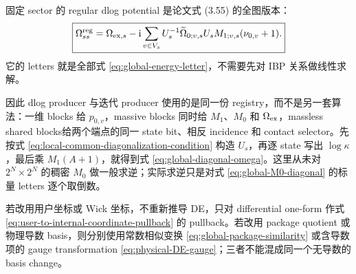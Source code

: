 \documentclass[11pt,a4paper]{ctexart}
\newcommand{\ii}{\mathrm i}
\begin{document}
固定 sector 的 regular dlog potential 是论文式 (3.55) 的全图版本：
\begin{equation}
 \boxed{
 \Omega_{ss}^{\rm reg}
 =\Omega_{{\rm ex},s}
 -\ii\sum_{v\in V_s}
 U_s^{-1}\widetilde\Omega_{0;v,s}U_s
 M_{1;v,s}(\nu_{0,v}+1).
 }
 \label{eq:global-diagonal-omega}
\end{equation}
它的 letters 就是全部式 \eqref{eq:global-energy-letter}，不需要先对 IBP 关系做线性求解。

因此 dlog producer 与迭代 producer 使用的是同一份 registry，而不是另一套算法：一维 blocks 给 $p_{0,v}$，massive blocks 同时给 $M_1$、$M_0$ 和 $\Omega_{\rm ex}$，massless shared blocks给两个端点的同一 state bit、相反 incidence 和 contact selector。先按式 \eqref{eq:local-common-diagonalization-condition} 构造 $U_s$，再逐 state 写出 $\log\kappa$，最后乘 $M_1(A+1)$，就得到式 \eqref{eq:global-diagonal-omega}。这里从未对 $2^N\times2^N$ 的稠密 $M_0$ 做一般求逆；实际求逆只是对式 \eqref{eq:global-M0-diagonal} 的标量 letters 逐个取倒数。

若改用用户坐标或 Wick 坐标，不重新推导 DE，只对 differential one-form 作式 \eqref{eq:user-to-internal-coordinate-pullback} 的 pullback。若改用 package quotient 或物理导数 basis，则分别使用常数相似变换 \eqref{eq:global-package-similarity} 或含导数项的 gauge transformation \eqref{eq:physical-DE-gauge}；三者不能混成同一个无导数的 basis change。
\end{document}
